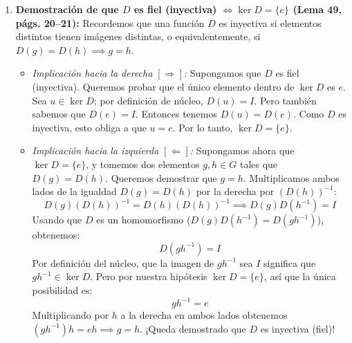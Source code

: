 \documentclass[11pt, a4paper]{article}
\begin{document}
\begin{enumerate}
    \item \textbf{Demostración de que $D$ es fiel (inyectiva) $\iff \ker D = \{e\}$ (Lema 49, págs. 20--21):}
    Recordemos que una función $D$ es inyectiva si elementos distintos tienen imágenes distintas, o equivalentemente, si $D(g) = D(h) \implies g = h$.
    \begin{itemize}
        \item \textit{Implicación hacia la derecha $[\Rightarrow]$:} Supongamos que $D$ es fiel (inyectiva). Queremos probar que el único elemento dentro de $\ker D$ es $e$. Sea $u \in \ker D$; por definición de núcleo, $D(u) = I$. Pero también sabemos que $D(e) = I$. Entonces tenemos $D(u) = D(e)$. Como $D$ es inyectiva, esto obliga a que $u = e$. Por lo tanto, $\ker D = \{e\}$.
        \item \textit{Implicación hacia la izquierda $[\Leftarrow]$:} Supongamos ahora que $\ker D = \{e\}$, y tomemos dos elementos $g, h \in G$ tales que $D(g) = D(h)$. Queremos demostrar que $g = h$.
        Multiplicamos ambos lados de la igualdad $D(g) = D(h)$ por la derecha por $(D(h))^{-1}$:
        \[
        D(g) (D(h))^{-1} = D(h) (D(h))^{-1} \implies D(g) D(h^{-1}) = I
        \]
        Usando que $D$ es un homomorfismo ($D(g) D(h^{-1}) = D(gh^{-1})$), obtenemos:
        \[
        D(gh^{-1}) = I
        \]
        Por definición del núcleo, que la imagen de $gh^{-1}$ sea $I$ significa que $gh^{-1} \in \ker D$. Pero por nuestra hipótesis $\ker D = \{e\}$, así que la única posibilidad es:
        \[
        gh^{-1} = e
        \]
        Multiplicando por $h$ a la derecha en ambos lados obtenemos $(gh^{-1})h = eh \implies g = h$. ¡Queda demostrado que $D$ es inyectiva (fiel)!
    \end{itemize}


\end{enumerate}
\end{document}
